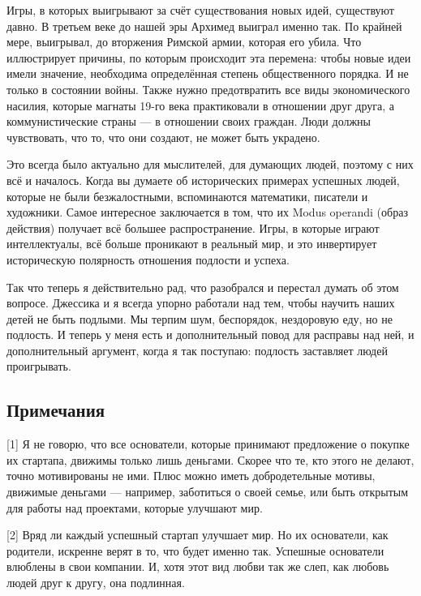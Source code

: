 \documentclass[ebook,12pt,oneside,openany]{memoir}
\begin{document}
Игры, в которых выигрывают за счёт существования новых идей,
существуют давно. В третьем веке до нашей эры Архимед выиграл именно
так. По крайней мере, выигрывал, до вторжения Римской армии, которая
его убила. Что иллюстрирует причины, по которым происходит эта
перемена: чтобы новые идеи имели значение, необходима определённая
степень общественного порядка. И не только в состоянии войны. Также
нужно предотвратить все виды экономического насилия, которые магнаты
19-го века практиковали в отношении друг друга, а коммунистические
страны — в отношении своих граждан. Люди должны чувствовать, что то,
что они создают, не может быть украдено. \newline

Это всегда было актуально для мыслителей, для думающих людей, поэтому
с них всё и началось. Когда вы думаете об исторических примерах
успешных людей, которые не были безжалостными, вспоминаются
математики, писатели и художники. Самое интересное заключается в том,
что их Modus operandi (образ действия) получает всё большее
распространение. Игры, в которые играют интеллектуалы, всё больше
проникают в реальный мир, и это инвертирует историческую полярность
отношения подлости и успеха. \newline

Так что теперь я действительно рад, что разобрался и перестал думать
об этом вопросе. Джессика и я всегда упорно работали над тем, чтобы
научить наших детей не быть подлыми. Мы терпим шум, беспорядок,
нездоровую еду, но не подлость. И теперь у меня есть и дополнительный
повод для расправы над ней, и дополнительный аргумент, когда я так
поступаю: подлость заставляет людей проигрывать. \newline

\subsection{Примечания}

[1] Я не говорю, что все основатели, которые принимают
предложение о покупке их стартапа, движимы только лишь деньгами.
Скорее что те, кто этого не делают, точно мотивированы не ими. Плюс
можно иметь добродетельные мотивы, движимые деньгами — например,
заботиться о своей семье, или быть открытым для работы над проектами,
которые улучшают мир. \newline

[2] Вряд ли каждый успешный стартап улучшает мир. Но их основатели,
как родители, искренне верят в то, что будет именно так. Успешные
основатели влюблены в свои компании. И, хотя этот вид любви так же
слеп, как любовь людей друг к другу, она подлинная. \newline
\end{document}
